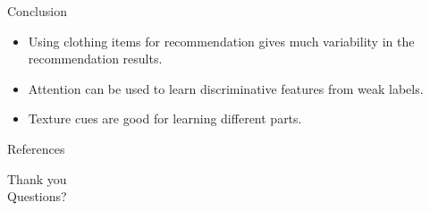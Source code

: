 \documentclass[handout]{beamer}
\begin{document}
\begin{frame}{Conclusion}
  \begin{itemize}
    \item Using clothing items for recommendation gives much variability in the recommendation results.
    \item Attention can be used to learn discriminative features from weak labels.
    \item Texture cues are good for learning different parts.
  \end{itemize}
\end{frame}

\begin{frame}{References}
  
    \tiny
\end{frame}

\begin{frame}
\huge{Thank you}\\
\huge{Questions?}\\
\end{frame}
\end{document}
